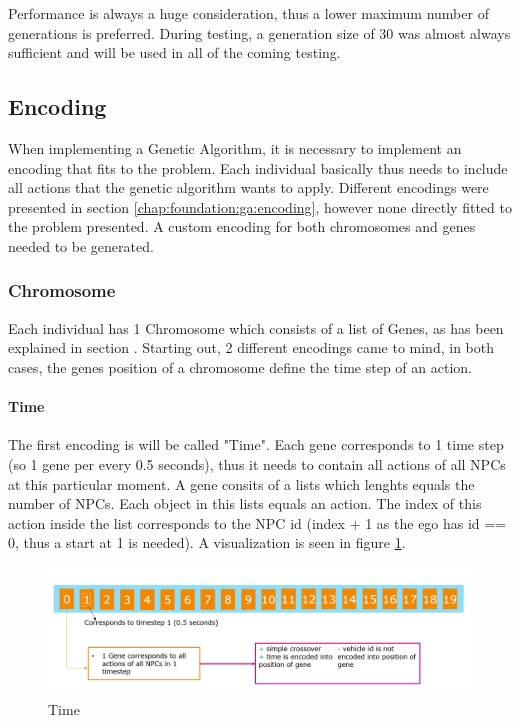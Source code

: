 Performance is always a huge consideration, thus a lower maximum number of generations is preferred. During testing, a generation size of 30 was almost always sufficient and will be used in all of the coming testing.


\subsection{Encoding}
When implementing a Genetic Algorithm, it is necessary to implement an encoding that fits to the problem. Each individual basically thus needs to include all actions that the genetic algorithm wants to apply. Different encodings were presented in section \ref{chap:foundation:ga:encoding}, however none directly fitted to the problem presented. A custom encoding for both chromosomes and genes needed to be generated.

\subsubsection{Chromosome}
Each individual has 1 Chromosome which consists of a list of Genes, as has been explained in section . Starting out, 2 different encodings came to mind, in both cases, the genes position of a chromosome define the time step of an action.

\paragraph{Time}
The first encoding is will be called "Time". Each gene corresponds to 1 time step (so 1 gene per every 0.5 seconds), thus it needs to contain all actions of all NPCs at this particular moment. A gene consits of a lists which lenghts equals the number of NPCs. Each object in this lists equals an action. The index of this action inside the list corresponds to the NPC id (index + 1 as the ego has id == 0, thus a start at 1 is needed). A visualization is seen in figure \ref{figure:encoding:chromosome:time}.

\begin{figure}[ht] 
	\includegraphics[width=1\linewidth]{figures/time_encoding}
	\caption{Time}
	\label{figure:encoding:chromosome:time}
\end{figure}

